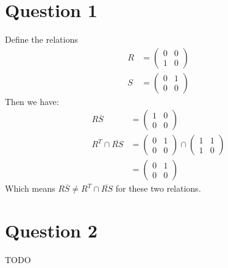 \documentclass[a4paper, fleqn]{article}
\begin{document}
\section*{Question 1}
Define the relations
\begin{align*}
R &=
\begin{pmatrix}
  0 & 0 \\
  1 & 0
\end{pmatrix} \\
S &=
\begin{pmatrix}
  0 & 1 \\
  0 & 0
\end{pmatrix} 
\end{align*}
Then we have:
\begin{align*}
R\overline{S} &= 
\begin{pmatrix}
  1 & 0 \\
  0 & 0
\end{pmatrix} \\
R^T \cap \overline{RS} &=
\begin{pmatrix}
  0 & 1 \\
  0 & 0
\end{pmatrix} \cap
\begin{pmatrix}
  1 & 1 \\
  1 & 0
\end{pmatrix} \\
&=
\begin{pmatrix}
  0 & 1 \\
  0 & 0
\end{pmatrix} 
\end{align*}
Which means $R\overline{S}\neq R^T \cap \overline{RS}$ for these two relations.

\section*{Question 2}
TODO
\end{document}
